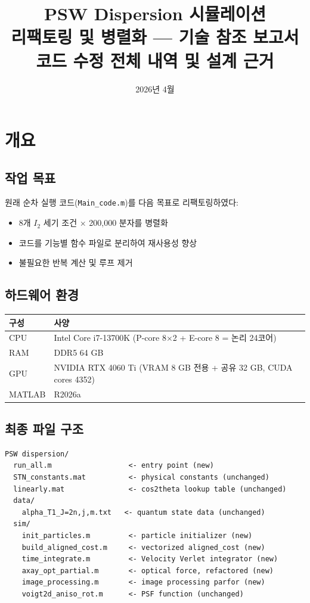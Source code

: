 \documentclass[11pt, a4paper]{article}
\title{\textbf{PSW Dispersion 시뮬레이션}\\
\textbf{리팩토링 및 병렬화 --- 기술 참조 보고서}\\[6pt]
\large 코드 수정 전체 내역 및 설계 근거}
\author{}
\date{2026년 4월}
\begin{document}
\maketitle
\tableofcontents
\newpage

\section{개요}

\subsection{작업 목표}

원래 순차 실행 코드(\texttt{Main\_code.m})를 다음 목표로 리팩토링하였다:

\begin{itemize}
  \item 8개 $I_2$ 세기 조건 $\times$ 200,000 분자를 병렬화
  \item 코드를 기능별 함수 파일로 분리하여 재사용성 향상
  \item 불필요한 반복 계산 및 루프 제거
\end{itemize}

\subsection{하드웨어 환경}

\begin{center}
\begin{tabular}{ll}
\toprule
구성 & 사양 \\
\midrule
CPU & Intel Core i7-13700K (P-core 8$\times$2 + E-core 8 = 논리 24코어) \\
RAM & DDR5 64 GB \\
GPU & NVIDIA RTX 4060 Ti (VRAM 8 GB 전용 + 공유 32 GB, CUDA cores 4352) \\
MATLAB & R2026a \\
\bottomrule
\end{tabular}
\end{center}

\subsection{최종 파일 구조}

\begin{verbatim}
PSW dispersion/
  run_all.m                  <- entry point (new)
  STN_constants.mat          <- physical constants (unchanged)
  linearly.mat               <- cos2theta lookup table (unchanged)
  data/
    alpha_T1_J=2n,j,m.txt   <- quantum state data (unchanged)
  sim/
    init_particles.m         <- particle initializer (new)
    build_aligned_cost.m     <- vectorized aligned_cost (new)
    time_integrate.m         <- Velocity Verlet integrator (new)
    axay_opt_partial.m       <- optical force, refactored (new)
    image_processing.m       <- image processing parfor (new)
    voigt2d_aniso_rot.m      <- PSF function (unchanged)
\end{verbatim}
\end{document}
